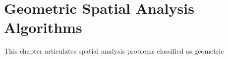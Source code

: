 \chapter{Geometric Spatial Analysis Algorithms}

This chapter articulates spatial analysis problems classified as geometric